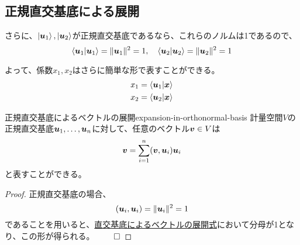 \documentclass[../../../topic_linear-algebra]{subfiles}
\begin{document}
\subsection{正規直交基底による展開}

さらに、$\ket{\vb*{u}_1}, \ket{\vb*{u}_2}$が正規直交基底であるなら、これらのノルムは1であるので、
\begin{equation*}
  \braket{\vb*{u}_1|\vb*{u}_1} = \|\vb*{u}_1\|^2 = 1, \quad \braket{\vb*{u}_2|\vb*{u}_2} = \|\vb*{u}_2\|^2 = 1
\end{equation*}

よって、係数$x_1, x_2$はさらに簡単な形で表すことができる。
\begin{align*}
  x_1 & = \braket{\vb*{u}_1|\vb*{x}} \\
  x_2 & = \braket{\vb*{u}_2|\vb*{x}}
\end{align*}

\begin{theorem}{正規直交基底によるベクトルの展開}{expansion-in-orthonormal-basis}
  計量空間$V$の正規直交基底$\vb*{u}_1, \ldots, \vb*{u}_n$に対して、任意のベクトル$\vb*{v} \in V$は
  \begin{equation*}
    \vb*{v} = \sum_{i=1}^n (\vb*{v}, \vb*{u}_i) \vb*{u}_i
  \end{equation*}
  と表すことができる。
\end{theorem}

\begin{proof}
  正規直交基底の場合、
  \begin{equation*}
    (\vb*{u}_i,\vb*{u}_i) = \|\vb*{u}_i\|^2 = 1
  \end{equation*}
  であることを用いると、\hyperref[thm:vector-expansion-by-orthogonal-basis]{直交基底によるベクトルの展開式}において分母が1となり、この形が得られる。 $\qed$
\end{proof}
\end{document}
